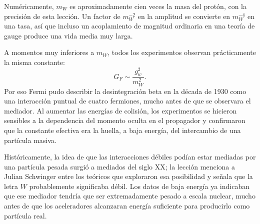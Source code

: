 Numéricamente, \(m_W\) es aproximadamente cien veces la masa del protón, con la precisión de esta lección. Un factor de \(m_W^{-2}\) en la amplitud se convierte en \(m_W^{-4}\) en una tasa, así que incluso un acoplamiento de magnitud ordinaria en una teoría de gauge produce una vida media muy larga.

\begin{classroomqa}
\end{classroomqa}

A momentos muy inferiores a \(m_W\), todos los experimentos observan prácticamente la misma constante:
\begin{equation}
  G_F\sim\frac{g_w^2}{m_W^2}.
\end{equation}
Por eso Fermi pudo describir la desintegración beta en la década de 1930 como una interacción puntual de cuatro fermiones, mucho antes de que se observara el mediador. Al aumentar las energías de colisión, los experimentos se hicieron sensibles a la dependencia del momento oculta en el propagador y confirmaron que la constante efectiva era la huella, a baja energía, del intercambio de una partícula masiva.

Históricamente, la idea de que las interacciones débiles podían estar mediadas por una partícula pesada surgió a mediados del siglo XX; la lección menciona a Julian Schwinger entre los teóricos que exploraron esa posibilidad y señala que la letra \(W\) probablemente significaba débil. Los datos de baja energía ya indicaban que ese mediador tendría que ser extremadamente pesado a escala nuclear, mucho antes de que los aceleradores alcanzaran energía suficiente para producirlo como partícula real.

